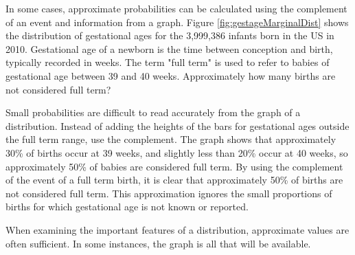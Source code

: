 
In some cases, approximate probabilities can be calculated using the complement of an event and information from a graph. Figure \ref{fig:gestageMarginalDist} shows the distribution of gestational ages for the 3,999,386 infants born in the US in 2010. Gestational age of a newborn is the time between conception and birth, typically recorded in weeks. The term "full term" is used to refer to babies of gestational age between 39 and 40 weeks. Approximately how many births are not considered full term?

Small probabilities are difficult to read accurately from the graph of a distribution. Instead of adding the heights of the bars for gestational ages outside the full term range, use the complement. The graph shows that approximately 30\% of births occur at 39 weeks, and slightly less than 20\% occur at 40 weeks, so approximately 50\% of babies are considered full term. By using the complement of the event of a full term birth, it is clear that approximately 50\% of births are not considered full term. This approximation ignores the small proportions of births for which gestational age is not known or reported.

When examining the important features of a distribution, approximate values are often sufficient. In some instances, the graph is all that will be available. 


